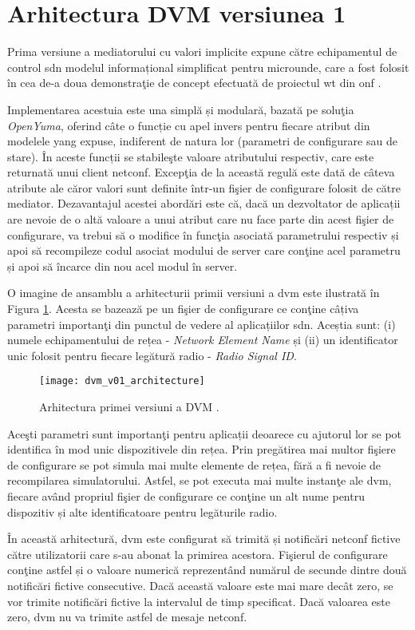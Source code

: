 \section{Arhitectura DVM versiunea 1}

Prima versiune a mediatorului cu valori implicite expune către echipamentul de control \gls{sdn} modelul informațional simplificat pentru microunde, care a fost folosit în cea de-a doua demonstraţie de concept efectuată de proiectul \gls{wt} din \gls{onf} \cite{stancu2016default}.

Implementarea acestuia este una simplă și modulară, bazată pe soluţia \textit{OpenYuma}, oferind câte o funcție cu apel invers pentru fiecare atribut din modelele \gls{yang} expuse, indiferent de natura lor (parametri de configurare sau de stare). În aceste funcții se stabileşte valoare atributului respectiv, care este returnată unui client \gls{netconf}. Excepţia de la această regulă este dată de câteva atribute ale căror valori sunt definite într-un fişier de configurare folosit de către mediator. Dezavantajul acestei abordări este că, dacă un dezvoltator de aplicații are nevoie de o altă valoare a unui atribut care nu face parte din acest fişier de configurare, va trebui să o modifice în funcţia asociată parametrului respectiv și apoi să recompileze codul asociat modului de server care conţine acel parametru și apoi să încarce din nou acel modul în server.

O imagine de ansamblu a arhitecturii primii versiuni a \gls{dvm} este ilustrată în Figura \ref{fig:dvm_v01_architecture}. Acesta se bazează pe un fişier de configurare ce conţine câțiva parametri importanţi din punctul de vedere al aplicațiilor \gls{sdn}. Aceștia sunt: (i) numele echipamentului de rețea - \textit{Network Element Name} și (ii) un identificator unic folosit pentru fiecare legătură radio - \textit{Radio Signal ID}.

\begin{figure}[h]
	\centering
	\texttt{[image: dvm\_v01\_architecture]}
	\caption{Arhitectura primei versiuni a DVM \cite{stancu2016default}.}
	\label{fig:dvm_v01_architecture}
\end{figure}

Aceşti parametri sunt importanţi pentru aplicații deoarece cu ajutorul lor se pot identifica în mod unic dispozitivele din rețea. Prin pregătirea mai multor fişiere de configurare se pot simula mai multe elemente de rețea, fără a fi nevoie de recompilarea simulatorului. Astfel, se pot executa mai multe instanţe ale \gls{dvm}, fiecare având propriul fişier de configurare ce conţine un alt nume pentru dispozitiv și alte identificatoare pentru legăturile radio.

În această arhitectură, \gls{dvm} este configurat să trimită și notificări \gls{netconf} fictive către utilizatorii care s-au abonat la primirea acestora. Fişierul de configurare conţine astfel și o valoare numerică reprezentând numărul de secunde dintre două notificări fictive consecutive. Dacă această valoare este mai mare decât zero, se vor trimite notificări fictive la intervalul de timp specificat. Dacă valoarea este zero, \gls{dvm} nu va trimite astfel de mesaje \gls{netconf}.
